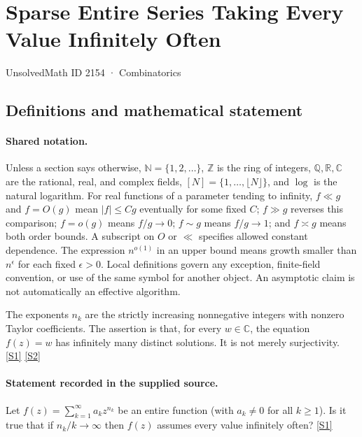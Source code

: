 \documentclass[11pt,a4paper]{article}
\newcommand{\N}{\mathbb{N}}
\newcommand{\Z}{\mathbb{Z}}
\newcommand{\Q}{\mathbb{Q}}
\newcommand{\R}{\mathbb{R}}
\newcommand{\C}{\mathbb{C}}
\newcommand{\sref}[2]{\hyperlink{source:#1:#2}{[S#2]}}
\begin{document}

\setcounter{section}{2153}

\section{Sparse Entire Series Taking Every Value Infinitely Often}\label{2154}

{\small\sffamily UnsolvedMath ID 2154 · Combinatorics}

\subsection{Definitions and mathematical statement}

\paragraph{Shared notation.}Unless a section says otherwise, $\N=\{1,2,\ldots\}$,
$\Z$ is the ring of integers, $\Q,\R,\C$ are the rational, real, and complex
fields, $[N]=\{1,\ldots,\lfloor N\rfloor\}$, and $\log$ is the natural
logarithm. For real functions of a parameter tending to infinity,
$f\ll g$ and $f=O(g)$ mean $|f|\leq Cg$ eventually for some fixed $C$;
$f\gg g$ reverses this comparison; $f=o(g)$ means $f/g\to0$;
$f\sim g$ means $f/g\to1$; and $f\asymp g$ means both order bounds.
A subscript on $O$ or $\ll$ specifies allowed constant dependence.
The expression $n^{o(1)}$ in an upper bound means growth smaller than
$n^\epsilon$ for each fixed $\epsilon>0$. Local definitions govern any
exception, finite-field convention, or use of the same symbol for another
object. An asymptotic claim is not automatically an effective algorithm.



The exponents $n_k$ are the strictly increasing nonnegative integers with nonzero Taylor coefficients. The assertion is that, for every $w\in\C$, the equation $f(z)=w$ has infinitely many distinct solutions. It is not merely surjectivity. \sref{2154}{1} \sref{2154}{2}

\paragraph{Statement recorded in the supplied source.}
Let $f(z)=\sum_{k=1}^\infty a_kz^{n_k}$ be an entire function (with $a_k\neq 0$ for all $k\geq 1$). Is it true that if $n_k/k\to \infty$ then $f(z)$ assumes every value infinitely often? \sref{2154}{1}
\end{document}
